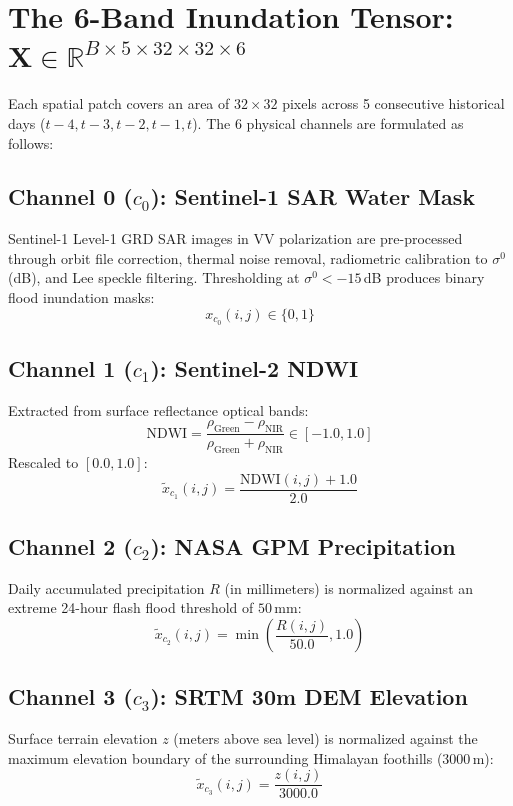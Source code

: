 \documentclass[12pt,a4paper,oneside]{report}
\begin{document}
\section{The 6-Band Inundation Tensor: \texorpdfstring{$\mathbf{X} \in \mathbb{R}^{B \times 5 \times 32 \times 32 \times 6}$}{X in R^{B x 5 x 32 x 32 x 6}}}
Each spatial patch covers an area of $32 \times 32$ pixels across 5 consecutive historical days ($t-4, t-3, t-2, t-1, t$). The 6 physical channels are formulated as follows:

\subsection{Channel 0 ($c_0$): Sentinel-1 SAR Water Mask}
Sentinel-1 Level-1 GRD SAR images in VV polarization are pre-processed through orbit file correction, thermal noise removal, radiometric calibration to $\sigma^0$ (dB), and Lee speckle filtering. Thresholding at $\sigma^0 < -15$\,dB produces binary flood inundation masks:
\begin{equation}
x_{c_0}(i, j) \in \{0, 1\}
\end{equation}

\subsection{Channel 1 ($c_1$): Sentinel-2 NDWI}
Extracted from surface reflectance optical bands:
\begin{equation}
\text{NDWI} = \frac{\rho_{\text{Green}} - \rho_{\text{NIR}}}{\rho_{\text{Green}} + \rho_{\text{NIR}}} \in [-1.0, 1.0]
\end{equation}
Rescaled to $[0.0, 1.0]$:
\begin{equation}
\tilde{x}_{c_1}(i, j) = \frac{\text{NDWI}(i, j) + 1.0}{2.0}
\end{equation}

\subsection{Channel 2 ($c_2$): NASA GPM Precipitation}
Daily accumulated precipitation $R$ (in millimeters) is normalized against an extreme 24-hour flash flood threshold of $50$\,mm:
\begin{equation}
\tilde{x}_{c_2}(i, j) = \min\left( \frac{R(i, j)}{50.0}, 1.0 \right)
\end{equation}

\subsection{Channel 3 ($c_3$): SRTM 30m DEM Elevation}
Surface terrain elevation $z$ (meters above sea level) is normalized against the maximum elevation boundary of the surrounding Himalayan foothills ($3000$\,m):
\begin{equation}
\tilde{x}_{c_3}(i, j) = \frac{z(i, j)}{3000.0}
\end{equation}
\end{document}
